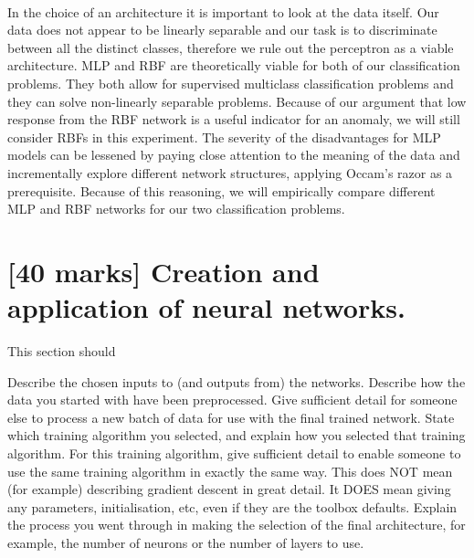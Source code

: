 \documentclass[11pt,a4paper]{article}
\begin{document}
\paragraph{}
In the choice of an architecture it is important to look at the data itself. Our data does not appear to be linearly separable and our task is to discriminate between all the distinct classes, therefore we rule out the perceptron as a viable architecture.
MLP and RBF are theoretically viable for both of our classification problems. They both allow for supervised multiclass classification problems and they can solve non-linearly separable problems. Because of our argument that low response from the RBF network is a useful indicator for an anomaly, we will still consider RBFs in this experiment. The severity of the disadvantages for MLP models can be lessened by paying close attention to the meaning of the data and incrementally explore different network structures, applying Occam's razor as a prerequisite. Because of this reasoning, we will empirically compare different MLP and RBF networks for our two classification problems.




\section{[40 marks] Creation and application of neural networks.}
\label{sec:creation}
This section should
\begin{outline}
  \1 Describe the chosen inputs to (and outputs from) the networks.
  \1 Describe how the data you started with have been preprocessed.
  \1 Give sufficient detail for someone else to process a new batch of data for use with the final trained network.
  \1 State which training algorithm you selected, and explain how you selected that training algorithm. For this training algorithm, give sufficient detail to enable someone to use the same training algorithm in exactly the same way. This does NOT mean (for example) describing gradient descent in great detail. It DOES mean giving any parameters, initialisation, etc, even if they are the toolbox defaults.
  \1 Explain the process you went through in making the selection of the final architecture, for example, the number of neurons or the number of layers to use.
\end{outline}
\end{document}

